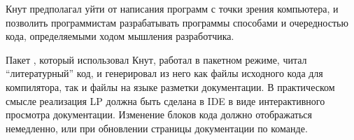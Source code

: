 Кнут предполагал уйти от написания программ с точки зрения компьютера, и
позволить программистам разрабатывать программы способами и очередностью кода,
определяемыми ходом мышления разработчика.

Пакет , который использовал Кнут, работал в пакетном режиме, читал
``литературный'' код, и генерировал из него как файлы исходного кода для
компилятора, так и файлы на языке разметки документации\note{\TeX}.
В практическом смысле реализация LP должна быть сделана в IDE в виде
интерактивного просмотра документации. Изменение блоков кода должно отображаться
немедленно, или при обновлении страницы документации по команде.

